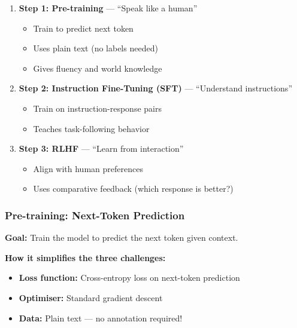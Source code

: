\begin{thmbox}
\begin{enumerate}
  \item \textbf{Step 1: Pre-training} --- ``Speak like a human''
  \begin{itemize}
    \item Train to predict next token
    \item Uses plain text (no labels needed)
    \item Gives fluency and world knowledge
  \end{itemize}
  
  \item \textbf{Step 2: Instruction Fine-Tuning (SFT)} --- ``Understand instructions''
  \begin{itemize}
    \item Train on instruction-response pairs
    \item Teaches task-following behavior
  \end{itemize}
  
  \item \textbf{Step 3: RLHF} --- ``Learn from interaction''
  \begin{itemize}
    \item Align with human preferences
    \item Uses comparative feedback (which response is better?)
  \end{itemize}
\end{enumerate}
\end{thmbox}

\bigseparator

\subsubsection{Pre-training: Next-Token Prediction}

\begin{defbox}
\textbf{Goal:} Train the model to predict the next token given context.

\textbf{How it simplifies the three challenges:}
\begin{itemize}
  \item \textbf{Loss function:} Cross-entropy loss on next-token prediction
  \item \textbf{Optimiser:} Standard gradient descent
  \item \textbf{Data:} Plain text --- no annotation required!
\end{itemize}
\end{defbox}

